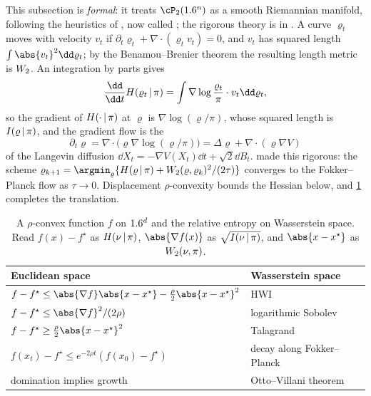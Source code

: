 \begin{refsection}
This subsection is \emph{formal}: it treats $\cP_2(\R^n)$ as a smooth Riemannian manifold, following the heuristics of \textcite{Otto2001}, now called ; the rigorous theory is in \textcite{AmbrosioGigliSavare2008}. A curve $\varrho_t$ moves with velocity $v_t$ if $\partial_t\varrho_t+\nabla\cdot(\varrho_tv_t)=0$, and $v_t$ has squared length $\int\abs{v_t}^2\dd\varrho_t$; by the Benamou--Brenier theorem the resulting length metric is $W_2$. An integration by parts gives
\[
\frac{\dd}{\dd t}\transportH{\varrho_t}{\pi}=\int\nabla\log\frac{\varrho_t}{\pi}\cdot v_t\dd\varrho_t,
\]
so the gradient of $H(\cdot\,|\,\pi)$ at $\varrho$ is $\nabla\log(\varrho/\pi)$, whose squared length is $I(\varrho\,|\,\pi)$, and the gradient flow is the 
\[
\partial_t\varrho=\nabla\cdot\bigl(\varrho\nabla\log(\varrho/\pi)\bigr)=\Delta\varrho+\nabla\cdot(\varrho\nabla V)
\]
of the Langevin diffusion $\dd X_t=-\nabla V(X_t)\dd t+\sqrt2\dd B_t$. \textcite{JordanKinderlehrerOtto1998} made this rigorous: the scheme $\varrho_{k+1}=\argmin_\varrho\{\transportH{\varrho}{\pi}+\transportW(\varrho,\varrho_k)^2/(2\tau)\}$ converges to the Fokker--Planck flow as $\tau\to0$. Displacement $\rho$-convexity bounds the Hessian below, and \cref{tab:transport:dictionary} completes the translation.

\begin{table}[t]
\centering
\caption{A $\rho$-convex function $f$ on $1.6^d$ and the relative entropy on Wasserstein space. Read $f(x)-f^\star$ as $H(\nu\,|\,\pi)$, $\abs{\nabla f(x)}$ as $\sqrt{I(\nu\,|\,\pi)}$, and $\abs{x-x^\star}$ as $W_2(\nu,\pi)$.}
\label{tab:transport:dictionary}
\small
\begin{tabular}{@{}ll@{}}
\toprule
Euclidean space & Wasserstein space\\
\midrule
$f-f^\star\le\abs{\nabla f}\abs{x-x^\star}-\frac\rho2\abs{x-x^\star}^2$ & HWI\\
$f-f^\star\le\abs{\nabla f}^2/(2\rho)$ & logarithmic Sobolev\\
$f-f^\star\ge\frac\rho2\abs{x-x^\star}^2$ & Talagrand\\
$f(x_t)-f^\star\le e^{-2\rho t}(f(x_0)-f^\star)$ & decay along Fokker--Planck\\
domination implies growth & Otto--Villani theorem\\
\bottomrule
\end{tabular}
\end{table}


\end{refsection}
